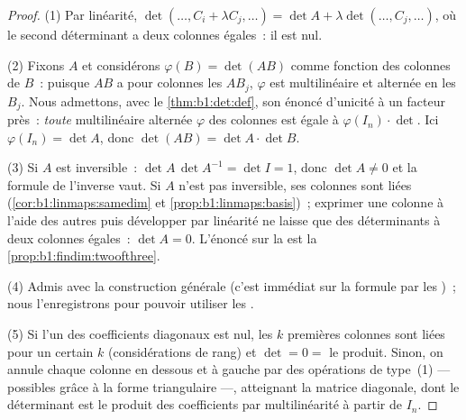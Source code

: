\begin{proof}
(1) Par linéarité, $\det(\dots, C_i + \lambda C_j, \dots) = \det A +
\lambda\det(\dots, C_j, \dots)$, où le second déterminant a deux
colonnes égales~: il est nul.

(2) Fixons $A$ et considérons $\varphi(B) = \det(AB)$ comme fonction
des colonnes de $B$~: puisque $AB$ a pour colonnes les $AB_j$,
$\varphi$ est multilinéaire et alternée en les $B_j$. Nous admettons,
avec le \cref{thm:b1:det:def}, son énoncé d'unicité à un facteur
près~: \emph{toute}  multilinéaire alternée $\varphi$
des colonnes est égale à $\varphi(I_n) \cdot \det$. Ici
$\varphi(I_n) = \det A$, donc $\det(AB) = \det A \cdot \det B$.

(3) Si $A$ est inversible~: $\det A\,\det A^{-1} = \det I = 1$, donc
$\det A \neq 0$ et la formule de l'inverse vaut. Si $A$ n'est pas
inversible, ses colonnes sont liées (\cref{cor:b1:linmaps:samedim}
et \cref{prop:b1:linmaps:basis})~; exprimer une colonne à l'aide des
autres puis développer par linéarité ne laisse que des déterminants à
deux colonnes égales~: $\det A = 0$. L'énoncé sur la  est
la \cref{prop:b1:findim:twoofthree}.

(4) Admis avec la construction générale (c'est immédiat sur la formule
par les )~; nous l'enregistrons pour pouvoir utiliser les
.

(5) Si l'un des coefficients diagonaux est nul, les $k$ premières
colonnes sont liées pour un certain $k$ (considérations de rang) et
$\det = 0 = $ le produit. Sinon, on annule chaque colonne en dessous et
à gauche par des opérations de type~(1) --- possibles grâce à la forme
triangulaire ---, atteignant la matrice diagonale, dont le déterminant
est le produit des coefficients par multilinéarité à partir de $I_n$.
\end{proof}


